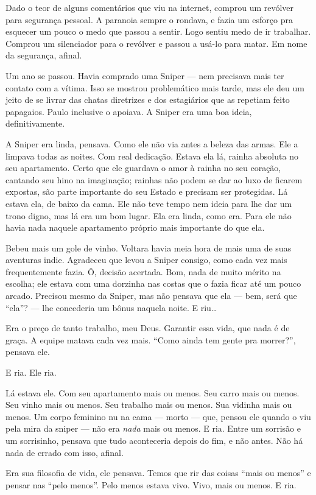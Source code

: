 \begin{sloppypar}
Dado o teor de alguns comentários que viu na internet, comprou um revólver para segurança pessoal. A paranoia sempre o rondava, e fazia um esforço pra esquecer um pouco o medo que passou a sentir. Logo sentiu medo de ir trabalhar. Comprou um silenciador para o revólver e passou a usá-lo para matar. Em nome da segurança, afinal.
\end{sloppypar}

Um ano se passou. Havia comprado uma Sniper --- nem precisava mais ter contato com a vítima. Isso se mostrou pro\-ble\-má\-ti\-co mais tarde, mas ele deu um jeito de se livrar das chatas diretrizes e dos estagiários que as repetiam feito papagaios. Paulo inclusive o apoiava. A Sniper era uma boa ideia, definitivamente.

A Sniper era linda, pensava. Como ele não via antes a beleza das armas. Ele a limpava todas as noites. Com real dedicação. Estava ela lá, rainha absoluta no seu apartamento. Certo que ele guardava o amor à rainha no seu coração, cantando seu hino na imaginação; rainhas não podem se dar ao luxo de ficarem expostas, são parte importante do seu Estado e precisam ser protegidas. Lá estava ela, de baixo da cama. Ele não teve tempo nem ideia para lhe dar um trono digno, mas lá era um bom lugar. Ela era linda, como era. Para ele não havia nada naquele apartamento próprio mais importante do que ela.

Bebeu mais um gole de vinho. Voltara havia meia hora de mais uma de suas aventuras indie. Agradeceu que levou a Sniper consigo, como cada vez mais frequentemente fazia. Ô, decisão acertada. Bom, nada de muito mérito na escolha; ele estava com uma dorzinha nas costas que o fazia ficar até um pouco arcado. Precisou mesmo da Sniper, mas não pensava que ela --- bem, será que ``ela''? --- lhe concederia um bônus naquela noite. E riu\ldots

Era o preço de tanto trabalho, meu Deus. Garantir essa vida, que nada é de graça. A equipe matava cada vez mais. ``Como ainda tem gente pra morrer?'', pensava ele.

E ria. Ele ria.

Lá estava ele. Com seu apartamento mais ou menos. Seu carro mais ou menos. Seu vinho mais ou menos. Seu trabalho mais ou menos. Sua vidinha mais ou menos. Um corpo feminino nu na cama --- morto --- que, pensou ele quando o viu pela mira da sniper --- não era \emph{nada} mais ou menos. E ria. Entre um sorrisão e um sorrisinho, pensava que tudo aconteceria depois do fim, e não antes. Não há nada de errado com isso, afinal.

Era sua filosofia de vida, ele pensava. Temos que rir das coisas ``mais ou menos'' e pensar nas ``pelo menos''. Pelo menos estava vivo. Vivo, mais ou menos. E ria.
